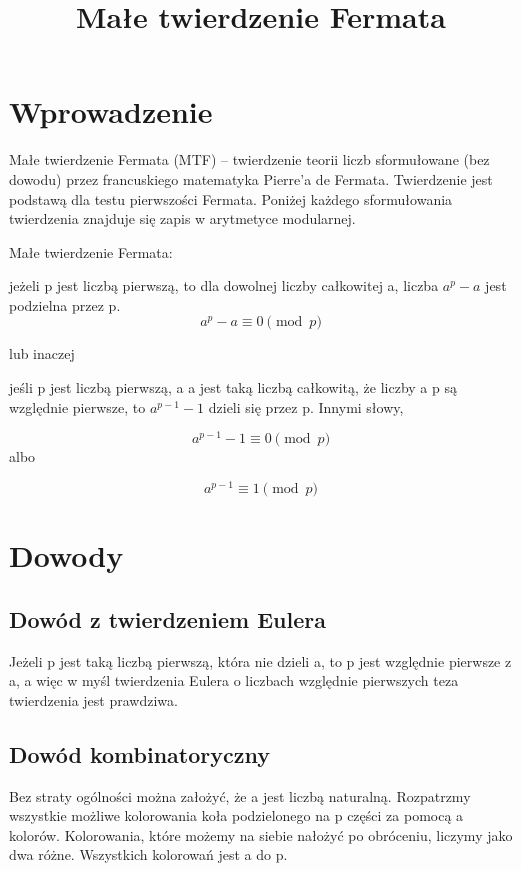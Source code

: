 \documentclass{article}
\begin{document}
\title{Małe twierdzenie Fermata}
\maketitle

\section*{Wprowadzenie}
Małe twierdzenie Fermata (MTF) – twierdzenie teorii liczb sformułowane (bez dowodu) przez francuskiego matematyka Pierre’a de Fermata. Twierdzenie jest podstawą dla testu pierwszości Fermata. Poniżej każdego sformułowania twierdzenia znajduje się zapis w arytmetyce modularnej.

Małe twierdzenie Fermata:

jeżeli p jest liczbą pierwszą, to dla dowolnej liczby całkowitej a, liczba $a^p - a$ jest podzielna przez p.
$$ a^{p}-a\equiv 0{\pmod {p}} $$

lub inaczej

jeśli p jest liczbą pierwszą, a a jest taką liczbą całkowitą, że liczby a p są względnie pierwsze, to \(a^{p-1}-1\) dzieli się przez p. Innymi słowy, 

\begin{equation}
	a^{p-1}-1\equiv 0{\pmod {p}}
\end{equation}
albo

\[ a^{p-1}\equiv 1{\pmod {p}} \]

\section*{Dowody}
\subsection*{Dowód z twierdzeniem Eulera}
Jeżeli p  jest taką liczbą pierwszą, która nie dzieli a, to p jest względnie pierwsze z a, a więc w myśl twierdzenia Eulera o liczbach względnie pierwszych teza twierdzenia jest prawdziwa. 

\subsection*{Dowód kombinatoryczny}
Bez straty ogólności można założyć, że a jest liczbą naturalną. Rozpatrzmy wszystkie możliwe kolorowania koła podzielonego na p części za pomocą a kolorów. Kolorowania, które możemy na siebie nałożyć po obróceniu, liczymy jako dwa różne. Wszystkich kolorowań jest a do p.
\end{document}
